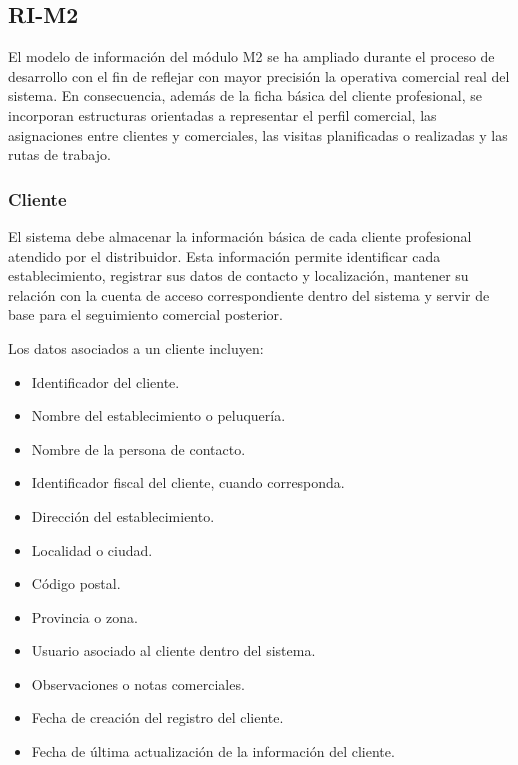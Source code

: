 \subsection{RI-M2}

El modelo de información del módulo M2 se ha ampliado durante el proceso de desarrollo con el fin de reflejar con mayor precisión la operativa comercial real del sistema. En consecuencia, además de la ficha básica del cliente profesional, se incorporan estructuras orientadas a representar el perfil comercial, las asignaciones entre clientes y comerciales, las visitas planificadas o realizadas y las rutas de trabajo.

\subsubsection*{Cliente}

El sistema debe almacenar la información básica de cada cliente profesional atendido por el distribuidor. Esta información permite identificar cada establecimiento, registrar sus datos de contacto y localización, mantener su relación con la cuenta de acceso correspondiente dentro del sistema y servir de base para el seguimiento comercial posterior.

Los datos asociados a un cliente incluyen:

\begin{itemize}
    \item Identificador del cliente.
    \item Nombre del establecimiento o peluquería.
    \item Nombre de la persona de contacto.
    \item Identificador fiscal del cliente, cuando corresponda.
    \item Dirección del establecimiento.
    \item Localidad o ciudad.
    \item Código postal.
    \item Provincia o zona.
    \item Usuario asociado al cliente dentro del sistema.
    \item Observaciones o notas comerciales.
    \item Fecha de creación del registro del cliente.
    \item Fecha de última actualización de la información del cliente.
\end{itemize}

